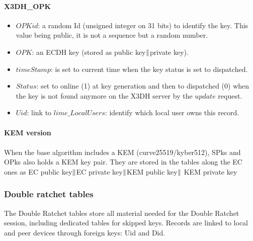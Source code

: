 \documentclass[a4paper,11pt]{article}
\begin{document}
  \paragraph*{X3DH\_OPK}
    \begin{itemize}
      \item $OPKid$: a random Id (unsigned integer on 31 bits) to identify the key. This value being public, it is not a sequence but a random number.
      \item $OPK$: an ECDH key (stored as public key$\Arrowvert $private key).
      \item $timeStamp$: is set to current time when the key status is set to dispatched.
      \item $Status$: set to online (1) at key generation and then to dispatched (0) when the key is not found anymore on the X3DH server by the $update$ request.
      \item $Uid$: link to $lime\_LocalUsers$: identify which local user owns this record.
    \end{itemize}

  \paragraph*{KEM version}
  \paragraph*{}When the base algorithm includes a KEM (curve25519/kyber512), SPks and OPks also holds a KEM key pair. They are stored in the tables along the EC ones as EC public key$\Arrowvert $EC private key$\Arrowvert $KEM public key$\Arrowvert $ KEM private key

    \subsubsection{Double ratchet tables}
    The Double Ratchet tables store all material needed for the Double Ratchet session, including dedicated tables for skipped keys. Records are linked to local and peer devices through foreign keys: Uid and Did.
\end{document}
